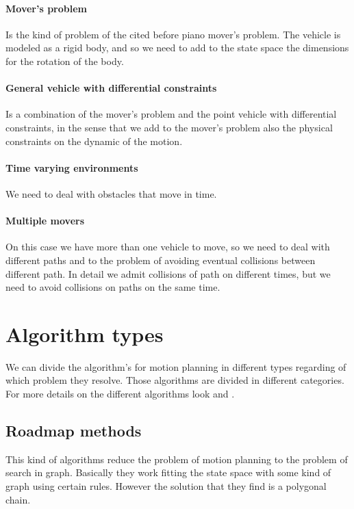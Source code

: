 \documentclass[dissertation.tex]{subfiles}
\begin{document}
\paragraph{Mover's problem}
Is the kind of problem of the cited before piano mover's problem. The
vehicle is modeled as a rigid body, and so we need to add to the state
space the
dimensions for the rotation of the body.

\paragraph{General vehicle with differential constraints}
Is a combination of the mover's problem and the point vehicle with
differential constraints, in the sense that we add to the mover's
problem also the physical constraints on the dynamic of the motion.

\paragraph{Time varying environments}
We need to deal with obstacles that move in time.

\paragraph{Multiple movers}
On this case we have more than one vehicle to move, so we need to deal
with different paths and to the problem of avoiding eventual
collisions between different path. In detail we admit collisions of
path on different times, but we need to avoid collisions on paths on
the same time.

\section{Algorithm types}
We can divide the algorithm's for motion planning in different types
regarding of which problem they resolve. Those algorithms are divided
in different categories.
For more details on the different algorithms look \cite{goerzen} and
\cite{choset}.

\subsection{Roadmap methods}
This kind of algorithms reduce the problem of motion planning to the
problem of search in graph. Basically they work fitting the state
space with some kind of graph using certain rules. However the
solution that they find is a polygonal chain.
\end{document}
